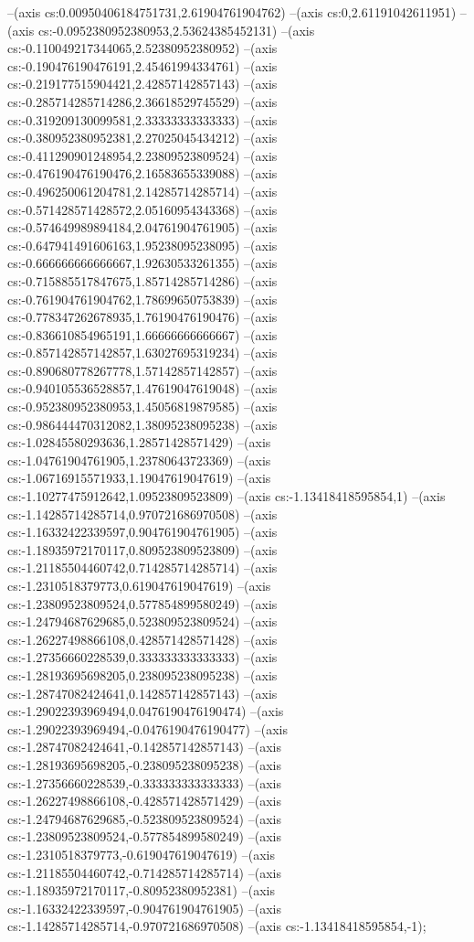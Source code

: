 --(axis cs:0.00950406184751731,2.61904761904762)
--(axis cs:0,2.61191042611951)
--(axis cs:-0.0952380952380953,2.53624385452131)
--(axis cs:-0.110049217344065,2.52380952380952)
--(axis cs:-0.190476190476191,2.45461994334761)
--(axis cs:-0.219177515904421,2.42857142857143)
--(axis cs:-0.285714285714286,2.36618529745529)
--(axis cs:-0.319209130099581,2.33333333333333)
--(axis cs:-0.380952380952381,2.27025045434212)
--(axis cs:-0.411290901248954,2.23809523809524)
--(axis cs:-0.476190476190476,2.16583655339088)
--(axis cs:-0.496250061204781,2.14285714285714)
--(axis cs:-0.571428571428572,2.05160954343368)
--(axis cs:-0.574649989894184,2.04761904761905)
--(axis cs:-0.647941491606163,1.95238095238095)
--(axis cs:-0.666666666666667,1.92630533261355)
--(axis cs:-0.715885517847675,1.85714285714286)
--(axis cs:-0.761904761904762,1.78699650753839)
--(axis cs:-0.778347262678935,1.76190476190476)
--(axis cs:-0.836610854965191,1.66666666666667)
--(axis cs:-0.857142857142857,1.63027695319234)
--(axis cs:-0.890680778267778,1.57142857142857)
--(axis cs:-0.940105536528857,1.47619047619048)
--(axis cs:-0.952380952380953,1.45056819879585)
--(axis cs:-0.986444470312082,1.38095238095238)
--(axis cs:-1.02845580293636,1.28571428571429)
--(axis cs:-1.04761904761905,1.23780643723369)
--(axis cs:-1.06716915571933,1.19047619047619)
--(axis cs:-1.10277475912642,1.09523809523809)
--(axis cs:-1.13418418595854,1)
--(axis cs:-1.14285714285714,0.970721686970508)
--(axis cs:-1.16332422339597,0.904761904761905)
--(axis cs:-1.18935972170117,0.809523809523809)
--(axis cs:-1.21185504460742,0.714285714285714)
--(axis cs:-1.2310518379773,0.619047619047619)
--(axis cs:-1.23809523809524,0.577854899580249)
--(axis cs:-1.24794687629685,0.523809523809524)
--(axis cs:-1.26227498866108,0.428571428571428)
--(axis cs:-1.27356660228539,0.333333333333333)
--(axis cs:-1.28193695698205,0.238095238095238)
--(axis cs:-1.28747082424641,0.142857142857143)
--(axis cs:-1.29022393969494,0.0476190476190474)
--(axis cs:-1.29022393969494,-0.0476190476190477)
--(axis cs:-1.28747082424641,-0.142857142857143)
--(axis cs:-1.28193695698205,-0.238095238095238)
--(axis cs:-1.27356660228539,-0.333333333333333)
--(axis cs:-1.26227498866108,-0.428571428571429)
--(axis cs:-1.24794687629685,-0.523809523809524)
--(axis cs:-1.23809523809524,-0.577854899580249)
--(axis cs:-1.2310518379773,-0.619047619047619)
--(axis cs:-1.21185504460742,-0.714285714285714)
--(axis cs:-1.18935972170117,-0.80952380952381)
--(axis cs:-1.16332422339597,-0.904761904761905)
--(axis cs:-1.14285714285714,-0.970721686970508)
--(axis cs:-1.13418418595854,-1);

